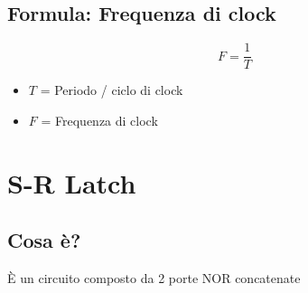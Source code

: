 \subsection{Formula: Frequenza di clock}
\begin{center}
    \begin{tcolorbox}[title=Frequenza di clock,width=0.65\textwidth]
        {
            \Large
            $$
            F = \frac{1}{T}
            $$

            \begin{itemize}
                \item $T$ = Periodo / ciclo di clock
                \item $F$ = Frequenza di clock
            \end{itemize}
        }
    \end{tcolorbox}
\end{center}

\newpage
\section{S-R Latch}
\subsection{Cosa è?}
È un circuito composto da 2 porte NOR concatenate

